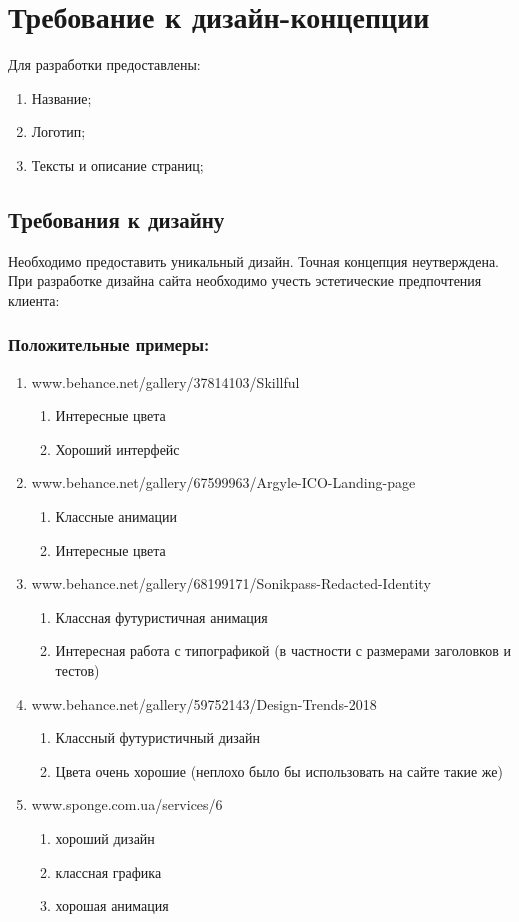 \section{Требование к дизайн-концепции}
Для разработки предоставлены:
\begin{enumerate}
  \item Название;
  \item Логотип;
  \item Тексты и описание страниц;
\end{enumerate}

\subsection{Требования к дизайну}
  Необходимо предоставить уникальный дизайн. Точная концепция неутверждена.
  При разработке дизайна сайта необходимо учесть эстетические предпочтения клиента:
\subsubsection{Положительные примеры:}
\begin{enumerate}
  \item www.behance.net/gallery/37814103/Skillful
  \begin{enumerate}
    \item Интересные цвета
    \item Хороший интерфейс
  \end{enumerate}
  \item www.behance.net/gallery/67599963/Argyle-ICO-Landing-page
  \begin{enumerate}
    \item Классные анимации
    \item Интересные цвета
  \end{enumerate}

  \item www.behance.net/gallery/68199171/Sonikpass-Redacted-Identity
  \begin{enumerate}
    \item Классная футуристичная анимация
    \item Интересная работа с типографикой (в частности с размерами заголовков и тестов)
  \end{enumerate}

  \item www.behance.net/gallery/59752143/Design-Trends-2018
  \begin{enumerate}
    \item Классный футуристичный дизайн
    \item Цвета очень хорошие (неплохо было бы использовать на сайте такие же)
  \end{enumerate}

  \item www.sponge.com.ua/services/6
  \begin{enumerate}
    \item хороший дизайн
    \item классная графика
    \item хорошая анимация
  \end{enumerate}
\end{enumerate}


